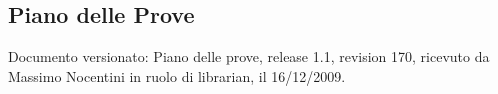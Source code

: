 \subsection{Piano delle Prove}
Documento versionato: Piano delle prove, release 1.1, revision 170, ricevuto da
Massimo Nocentini in ruolo di librarian, il 16/12/2009.